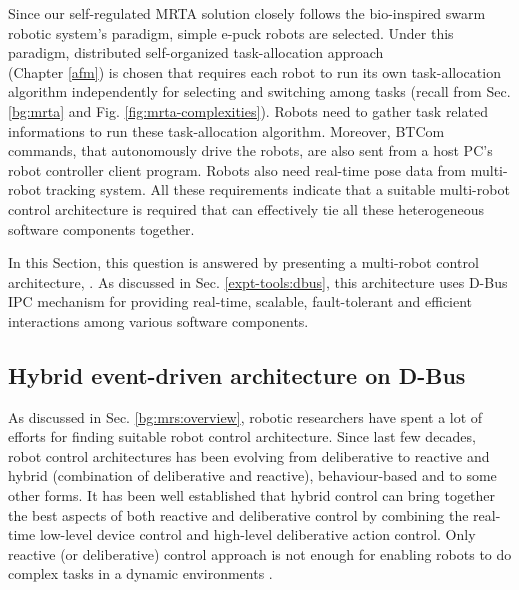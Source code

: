 Since our  self-regulated MRTA solution closely follows the bio-inspired swarm robotic system's paradigm,  simple e-puck robots are selected.  Under this paradigm,  distributed self-organized task-allocation approach\\ (Chapter \ref{afm}) is chosen that requires each robot to run its own task-allocation algorithm independently for selecting and switching among tasks (recall from Sec. \ref{bg:mrta} and Fig. \ref{fig:mrta-complexities}).  Robots need to gather task related informations to run these  task-allocation algorithm. Moreover, BTCom  commands, that autonomously drive the robots, are also sent from a host PC's robot controller client program. Robots also need real-time pose data from multi-robot tracking system. All these requirements indicate that a suitable multi-robot control architecture is required that can effectively tie all these heterogeneous software components together.

In this Section,  this question is answered by presenting a multi-robot control architecture, .  As discussed in Sec. \ref{expt-tools:dbus}, this architecture uses D-Bus IPC mechanism for providing real-time, scalable, fault-tolerant and efficient interactions among various software components.
\subsection{Hybrid event-driven architecture on D-Bus}
As discussed in Sec. \ref{bg:mrs:overview}, robotic researchers have spent a lot of efforts for finding suitable robot control architecture. Since last few decades, robot control architectures has been evolving from deliberative to reactive and hybrid (combination of deliberative and reactive), behaviour-based and to some other forms. It has been well established that hybrid control can bring together the best aspects of both reactive and deliberative control by combining the real-time low-level device control and high-level deliberative action control. Only reactive (or deliberative) control approach is not enough for enabling robots to do complex tasks in a dynamic environments \cite{Gat1997}.

